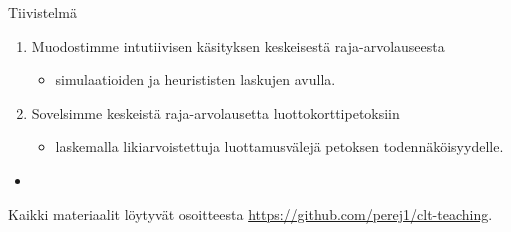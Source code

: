 \documentclass{beamer}
\begin{document}
\begin{frame}{Tiivistelmä}
  \begin{enumerate}
    \item Muodostimme intutiivisen käsityksen keskeisestä raja-arvolauseesta
    \begin{itemize}
      \item simulaatioiden ja heurististen laskujen avulla.
    \end{itemize}
    \pause
    \item Sovelsimme keskeistä raja-arvolausetta luottokorttipetoksiin
    \begin{itemize}
      \item laskemalla likiarvoistettuja luottamusvälejä petoksen
      todennäköisyydelle.
    \end{itemize}
  \end{enumerate}
  \begin{itemize}
    \item[]
  \end{itemize}
  \pause
  Kaikki materiaalit löytyvät osoitteesta
  \url{https://github.com/perej1/clt-teaching}.
\end{frame}
\end{document}
